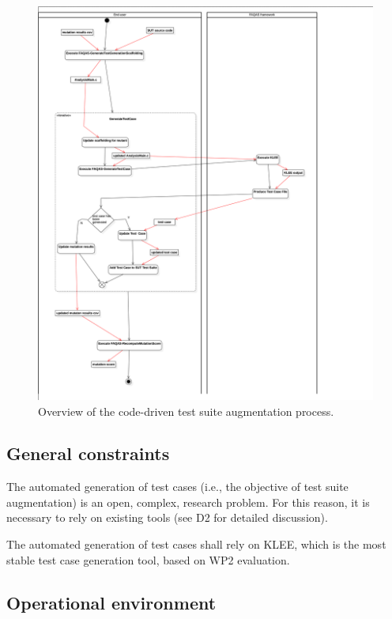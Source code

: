 \begin{figure}[h]
  \centering
	\includegraphics[width=15cm]{images/png/Activity1!CodeDrivenTestSuiteAugmentation_2.png}
      \caption{Overview of the code-driven test suite augmentation process.}
      \label{fig:process:codeDriven:augmentation}
\end{figure}


\clearpage

\subsection{General constraints}

\RQ{} The automated generation of test cases (i.e., the objective of test suite augmentation) is an open, complex, research problem. For this reason, it is necessary to rely on existing tools (see D2 for detailed discussion).

\RQ{} The automated generation of test cases shall rely on KLEE, which is the most stable test case generation tool, based on WP2 evaluation.

\clearpage

\subsection{Operational environment}

